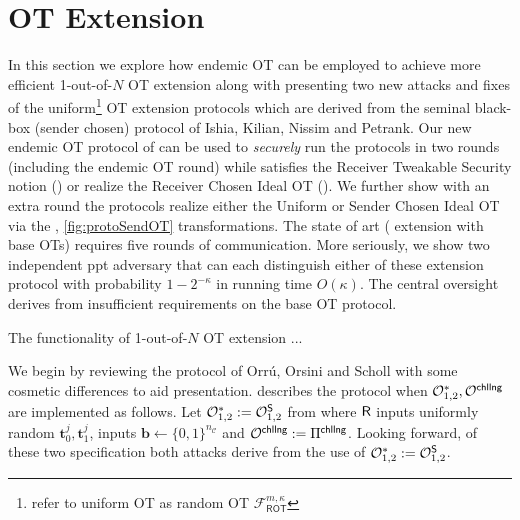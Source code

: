 

\newcommand{\rr}{\ensuremath{\boldsymbol{r}}}
\renewcommand{\tt}{\ensuremath{\boldsymbol{t}}}
\newcommand{\ww}{\ensuremath{\boldsymbol{w}}}
\newcommand{\cc}{\ensuremath{\boldsymbol{c}}}
\newcommand{\uu}{\ensuremath{\boldsymbol{u}}}
\newcommand{\qq}{\ensuremath{\boldsymbol{q}}}
\newcommand{\bb}{\ensuremath{\boldsymbol{b}}}
\newcommand{\vv}{\ensuremath{\boldsymbol{v}}}
\newcommand{\nc}{\ensuremath{{n_\mathcal{C}}}}
\newcommand{\kc}{\ensuremath{{k_\mathcal{C}}}}
\newcommand{\dc}{\ensuremath{{d_\mathcal{C}}}}

\section{OT Extension}


In this section we explore how endemic OT can be employed to achieve more efficient 1-out-of-$N$ OT extension along with presenting two new attacks and fixes of the uniform\footnote{\cite{KOS15, OOS16} refer to uniform OT as random OT $\mathcal{F}^{m,\kappa}_{\textsf{ROT}}$} OT extension protocols\cite{KOS15, OOS16} which are derived from the seminal black-box (sender chosen) protocol of Ishia, Kilian, Nissim and Petrank\cite{IKNP03}. Our new endemic OT protocol of  can be used to \emph{securely} run the protocols in two rounds (including the endemic OT round) while satisfies the Receiver Tweakable Security notion () or realize the Receiver Chosen Ideal OT (). We further show with an extra round the \cite{KOS15, OOS16} protocols realize either the Uniform or Sender Chosen Ideal OT via the , \ref{fig:protoSendOT} transformations. The state of art (\cite{OOS16,KOS15} extension with \cite{simplestOT} base OTs) requires five rounds of communication. More seriously, we show two independent ppt adversary that can each distinguish either of these extension protocol with probability $1-2^{-\kappa}$ in running time $O(\kappa)$. The central oversight derives from insufficient requirements on the base OT protocol.

The functionality of 1-out-of-$N$ OT extension ...

We begin by reviewing the protocol of Orr\'u, Orsini and Scholl\cite{OOS16} with some cosmetic differences to aid presentation.  describes the \cite{OOS16} protocol when $\mathcal{O}^*_{1,2},\mathcal{O}^{\textsf{chllng}}$ are implemented as follows.  Let $\mathcal{O}^*_{1,2}:=\mathcal{O}^\mathsf{S}_{1,2}$ from  where $\mathsf{R}$ inputs uniformly random $\tt^j_0,\tt^j_1$, \send inputs $\bb\gets\{0,1\}^\nc$ and $\mathcal{O}^{\textsf{chllng}}:=\Pi^{\textsf{chllng}}$. Looking forward, of these two specification both attacks derive from the use of $\mathcal{O}^*_{1,2}:=\mathcal{O}^\mathsf{S}_{1,2}$. 

